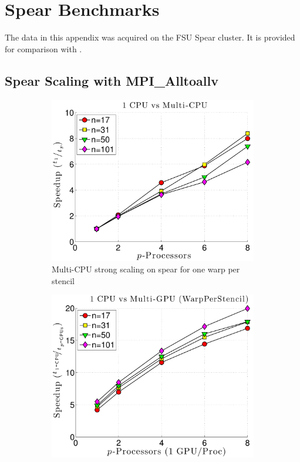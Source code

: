 \chapter{Spear Benchmarks} 
\label{app:spear_alltoallv_benchmarks}

The data in this appendix was acquired on the FSU Spear cluster. It is provided for comparison with \cite{BolligFlyerErlebacher2012}.

\section{Spear Scaling with MPI\_Alltoallv}

\begin{figure}
\centering
\begin{subfigure}[t]{0.425\textwidth}
\centering
\includegraphics[width=1.0\textwidth]{../figures/spear_results/vortex/speedup_1CPU_vs_NCPU-eps-converted-to.pdf}
\caption{Multi-CPU strong scaling on spear for one warp per stencil}
\label{fig:alltoall_multicpu_scaling}
\end{subfigure} 
\begin{subfigure}[t]{0.425\textwidth}
\centering
\includegraphics[width=1.0\textwidth]{../figures/spear_results/vortex/speedup_1CPU_vs_NGPU_WarpPerStencil-eps-converted-to.pdf}

\end{subfigure}
\end{figure}
